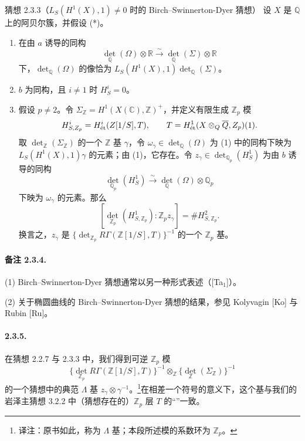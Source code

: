 \begin{statement}{猜想 2.3.3（$L_S(H^1(X),1)\ne0$ 时的 Birch--Swinnerton-Dyer 猜想）}
设 $X$ 是 $\mathbb Q$ 上的阿贝尔簇，并假设 (*)。
\begin{enumerate}[label=(\arabic*)]
\item 在由 $a$ 诱导的同构
\[
 \det_{\mathbb Q}(\Omega)\otimes\mathbb R
 \xrightarrow{\sim}\det_{\mathbb Q}(\Sigma)\otimes\mathbb R
\]
下，$\det_{\mathbb Q}(\Omega)$ 的像恰为 $L_S(H^1(X),1)\det_{\mathbb Q}(\Sigma)$。
\item $b$ 为同构，且 $i\ne1$ 时 $H^i_S=0$。
\item 假设 $p\ne2$。令 $\Sigma_{\mathbb Z}=H^1(X(\mathbb C),\mathbb Z)^+$，并定义有限生成 $\mathbb Z_p$ 模
\[
 H^i_{S,Z_p}=H^i_{\mathrm{\acute et}}(Z[1/S],T),\qquad
 T=H^1_{\mathrm{\acute et}}(X\otimes_{Q}\overline{Q},Z_p)(1).
\]
取 $\det_{\mathbb Z}(\Sigma_{\mathbb Z})$ 的一个 $\mathbb Z$ 基 $\gamma$，令 $\omega_\gamma\in\det_{\mathbb Q}(\Omega)$ 为 (1) 中的同构下映为 $L_S(H^1(X),1)\gamma$ 的元素；由 (1)，它存在。令 $z_\gamma\in\det_{\mathbb Q_p}(H^1_S)$ 为由 $b$ 诱导的同构
\[
 \det_{\mathbb Q_p}(H^1_S)\xrightarrow{\sim}\det_{\mathbb Q}(\Omega)\otimes\mathbb Q_p
\]
下映为 $\omega_\gamma$ 的元素。那么
\[
 [\det_{\mathbb Z_p}(H^1_{S,\mathbb Z_p}):\mathbb Z_pz_\gamma]
 =\#H^2_{S,\mathbb Z_p}.
\]
换言之，$z_\gamma$ 是 $\{\det_{\mathbb Z_p}R\Gamma(\mathbb Z[1/S],T)\}^{-1}$ 的一个 $\mathbb Z_p$ 基。
\end{enumerate}
\end{statement}

\paragraph{备注 2.3.4.} (1) Birch--Swinnerton-Dyer 猜想通常以另一种形式表述（[Ta$_1$]）。

(2) 关于椭圆曲线的 Birch--Swinnerton-Dyer 猜想的结果，参见 Kolyvagin [Ko] 与 Rubin [Ru]。

\paragraph{2.3.5.} 在猜想 2.2.7 与 2.3.3 中，我们得到可逆 $\mathbb Z_p$ 模
\[
 \{\det_{\mathbb Z_p}R\Gamma(\mathbb Z[1/S],T)\}^{-1}
 \otimes_{\mathbb Z}\{\det_{\mathbb Z}(\Sigma_{\mathbb Z})\}^{-1}
\]
的一个猜想中的典范 $\Lambda$ 基 $z_\gamma\otimes\gamma^{-1}$。\footnote{译注：原书如此，称为 $\Lambda$ 基；本段所述模的系数环为 $\mathbb Z_p$。}在相差一个符号的意义下，这个基与我们的岩泽主猜想 3.2.2 中（猜想存在的）$\mathbb Z_p$ 层 $T$ 的“”一致。

